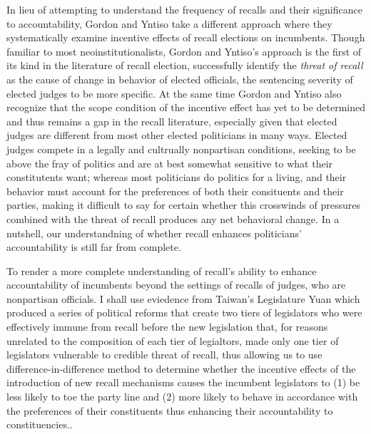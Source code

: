 \documentclass[hyphens, crop=false]{standalone}
\begin{document}
	In lieu of attempting to understand the frequency of recalls and their significance to accountability,
	Gordon and Yntiso \autocite*{gordonIncentiveEffectsRecall2021a}
	take a different approach
	where they systematically examine
	incentive effects of recall elections on incumbents.
	Though familiar to most neoinstitutionalists,
	Gordon and Yntiso's approach is the first of its kind in the literature of recall election,
	successfully identify the \textit{threat of recall}
	as the cause of change in behavior of elected officials, 
	the sentencing severity of elected judges to be more specific.
	At the same time 
	Gordon and Yntiso \autocite*{gordonIncentiveEffectsRecall2021a} also recognize that the scope condition of the incentive effect has yet to be determined
	and thus remains a gap in the recall literature,
	especially given that elected judges are different from most other elected politicians in many ways.
	Elected judges compete in a legally and cultrually nonpartisan conditions,
	seeking to be above the fray of politics and are at best somewhat sensitive to what their constitutents want;
	whereas most politicians do politics for a living,
	and their behavior must account for the preferences of both their consituents and their parties,
	making it difficult to say for certain 
	whether this crosswinds of pressures combined with the threat of recall
	produces any net behavioral change.
	In a nutshell, our understandning of whether recall enhances
	politicians' accountability
	is still far from complete.

	To render a more complete understanding of recall's ability to enhance accountability of incumbents
	beyond the settings of recalls of judges, who are nonpartisan officials. I shall use eviedence from Taiwan's Legislature Yuan which produced a series of political reforms that create two tiers of legislators who were effectively immune from recall before the new legislation that, for reasons unrelated to the composition of each tier of legialtors, made only one tier of legislators vulnerable to credible threat of recall, thus allowing us to use difference-in-difference method to determine whether the incentive effects of the introduction of new recall mechanisms causes the incumbent legislators to 
	(1) be less likely to toe the party line
	and
	(2)
	more likely to behave in accordance with the preferences of their constituents
	thus enhancing their accountability to constituencies..
	
\end{document}
